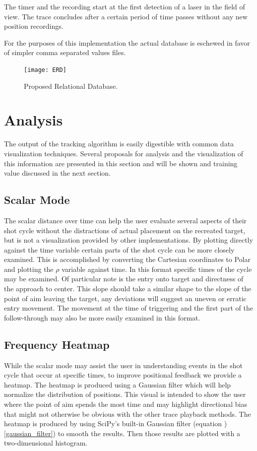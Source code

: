 \documentclass[conference]{IEEEtran}
\begin{document}
The timer and the recording start at the first detection of a laser in the field of view.
The trace concludes after a certain period of time passes without any new position recordings.

For the purposes of this implementation the actual database is eschewed in favor of simpler comma separated values files.

\begin{figure}[]
	\centering
	\texttt{[image: ERD]}
	\caption{Proposed Relational Database.}
	\label{fig:database}
\end{figure}


\section{Analysis}

The output of the tracking algorithm is easily digestible with common data visualization techniques.
Several proposals for analysis and the visualization of this information are presented in this section and will be shown and training value discussed in the next section.

\subsection{Scalar Mode}

The scalar distance over time can help the user evaluate several aspects of their shot cycle without the distractions of actual placement on the recreated target,
but is not a visualization provided by other implementations.
By plotting directly against the time variable certain parts of the shot cycle
\cite{Zeljko2010,Zeljko2020}
can be more closely examined.
This is accomplished by converting the Cartesian coordinates to Polar and plotting the $\rho$ variable against time.
In this format specific times of the cycle may be examined.
Of particular note is the entry onto target and directness of the approach to center.
This slope should take a similar shape to the slope of the point of aim leaving the target, any deviations will suggest an uneven or erratic entry movement.
The movement at the time of triggering and the first part of the follow-through may also be more easily examined in this format.

\subsection{Frequency Heatmap}

While the scalar mode may assist the user in understanding events in the shot cycle that occur at specific times, to improve positional feedback we provide a heatmap.
The heatmap is produced using a Gaussian filter which will help normalize the distribution of positions.
This visual is intended to show the user where the point of aim spends the most time and may highlight directional bias that might not otherwise be obvious with the other trace playback methods.
The heatmap is produced by using SciPy's built-in Gaussian filter 
\cite{Nixon2019}(equation )\ref{gaussian_filter}) to smooth the results. 
Then those results are plotted with a two-dimensional histogram.
\end{document}
